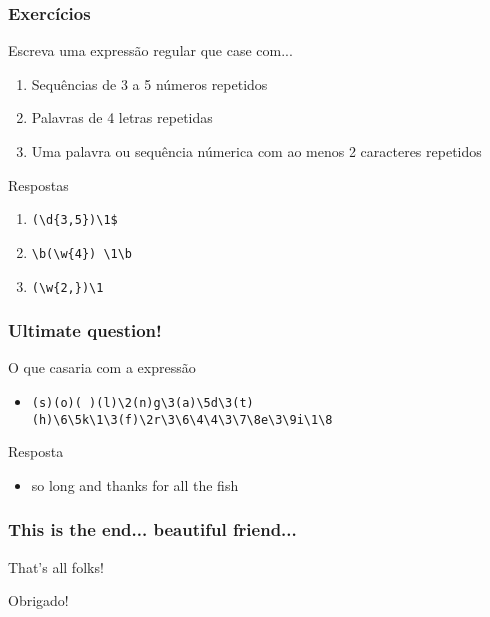 \documentclass{beamer}
\begin{document}
\begin{frame}[fragile]
 \frametitle{Exercícios}
 \begin{block}{Escreva uma expressão regular que case com...}
  \begin{enumerate}
   \item Sequências de 3 a 5 números repetidos
   \item Palavras de 4 letras repetidas
   \item Uma palavra ou sequência númerica com ao menos 2 caracteres repetidos
  \end{enumerate}
 \end{block}

 \pause
 \begin{block}{Respostas}
  \begin{enumerate}
   \item \verb=(\d{3,5})\1$=
	\pause
   \item \verb=\b(\w{4}) \1\b=
	\pause
   \item \verb=(\w{2,})\1=
  \end{enumerate}
 \end{block}
\end{frame}

\begin{frame}[fragile]
 \frametitle{Ultimate question!}
 \begin{block}{O que casaria com a expressão}
  \begin{itemize}
   \item {\tiny\verb=(s)(o)( )(l)\2(n)g\3(a)\5d\3(t)(h)\6\5k\1\3(f)\2r\3\6\4\4\3\7\8e\3\9i\1\8=}
  \end{itemize}
 \end{block}

 \pause
 \begin{block}{Resposta}
  \begin{itemize}
   \item so long and thanks for all the fish
  \end{itemize}
 \end{block}
\end{frame}

\begin{frame}
 \frametitle{This is the end... beautiful friend...}
 \begin{block}{That's all folks!}
  \begin{center}
   {\LARGE Obrigado!}
  \end{center}
 \end{block}
\end{frame}
\end{document}
